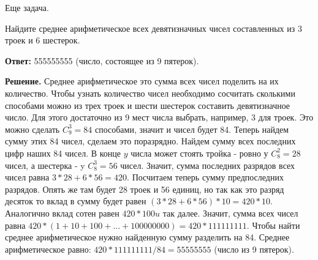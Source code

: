 Еще задача.

Найдите среднее арифметическое всех девятизначных чисел составленных из 3 троек и 6 шестерок.

\textbf{Ответ:} 555555555 (число, состоящее из 9 пятерок).

\textbf{Решение.} Среднее арифметическое это сумма всех чисел поделить на их количество. Чтобы узнать количество чисел необходимо сосчитать сколькими способами можно из трех троек и шести шестерок составить девятизначное число. Для этого достаточно из 9 мест числа выбрать, например, 3 для троек. Это можно сделать $C_9^3=84$ способами, значит и чисел будет 84. Теперь найдем сумму этих 84 чисел, сделаем это поразрядно. Найдем сумму всех последних цифр наших 84 чисел. В конце $y$ числа может стоять тройка - ровно у $C_8^2=28$ чисел, а шестерка - y $C_8^3=56$ чисел. Значит, сумма последних разрядов всех чисел равна $3 * 28+6 * 56=420$. Посчитаем теперь сумму предпоследних разрядов. Опять же там будет 28 троек и 56 единиц, но так как это разряд десяток то вклад в сумму будет равен $(3 * 28+6 * 56) * 10=420 * 10$. Аналогично вклад сотен равен $420 * 100 u$ так далее. Значит, сумма всех чисел равна $420 *(1+10+100+\ldots+100000000)=420 * 111111111$. Чтобы найти среднее арифметическое нужно найденную сумму разделить на 84. Среднее арифметическое равно: $420 * 111111111 / 84=55555555$ (число из 9 пятерок).